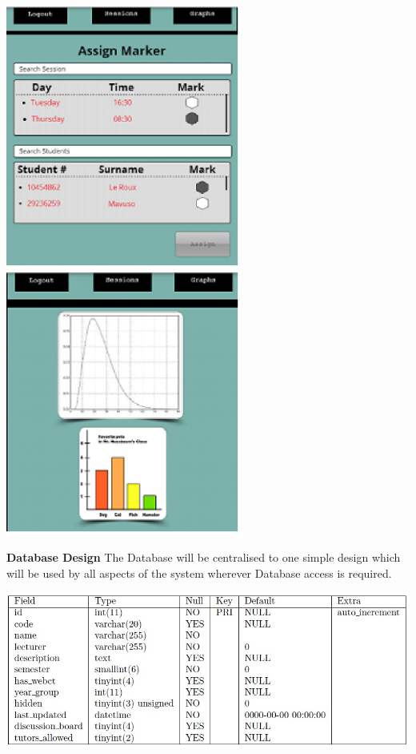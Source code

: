 \documentclass{article}
\begin{document}
\noindent \textbf{\includegraphics*[width=3.05in, height=3.41in, keepaspectratio=false]{image11}    \includegraphics*[width=3.05in, height=3.41in, keepaspectratio=false]{image12}}

\noindent \textbf{}

\noindent \textbf{}

\noindent \textbf{Database Design}
The Database will be centralised to one simple design which will be used by all aspects of the system wherever Database access is required.

\noindent \textbf{\includegraphics[scale=0.4]{DatabaseDesign.jpg}}
\end{document}
